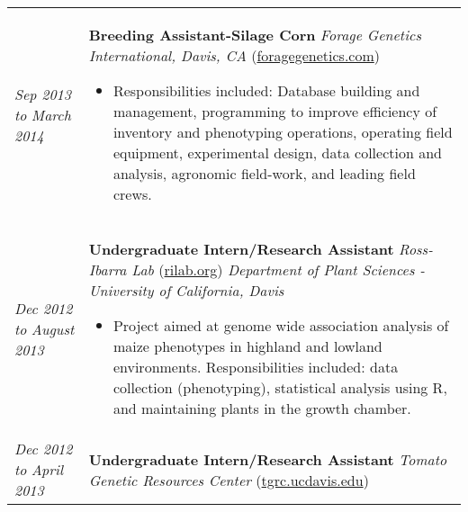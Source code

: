 ﻿\documentclass[a4paper]{article}
\begin{document}
\begin{tabular}{p{3cm} p{14cm}}
%
\\
%
\vspace{0pt} 
\textit{Sep 2013}\newline
\textit{to}\newline
\textit{March 2014}\newline
& 
\vspace{0pt}
\textbf{Breeding Assistant-Silage Corn}\newline
\textit{Forage Genetics International, Davis, CA} (\href{http://www.foragegenetics.com/}{foragegenetics.com})
\begin{itemize}[noitemsep,topsep=0pt]
  \item Responsibilities included: Database building and management, programming to improve efficiency of inventory and phenotyping operations, operating field equipment, experimental design, data collection and analysis, agronomic field-work, and leading field crews.
\end{itemize}
%
\\
%
\vspace{0pt} 
\textit{Dec 2012}\newline
\textit{to}\newline
\textit{August 2013}\newline
& 
\vspace{0pt}
\textbf{Undergraduate Intern/Research Assistant}\newline
\textit{Ross-Ibarra Lab} (\href{http://www.rilab.org/}{rilab.org})\newline
\textit{Department of Plant Sciences - University of California, Davis}
\begin{itemize}[noitemsep,topsep=0pt]
  \item Project aimed at genome wide association analysis of maize phenotypes in highland and lowland environments. Responsibilities included: data collection (phenotyping), statistical analysis using R, and maintaining plants in the growth chamber.
\end{itemize}
%
\\
%
\vspace{0pt} 
\textit{Dec 2012}\newline
\textit{to}\newline
\textit{April 2013}\newline
&
\vspace{0pt}
\textbf{Undergraduate Intern/Research Assistant}\newline
\textit{Tomato Genetic Resources Center} (\href{http://tgrc.ucdavis.edu/}{tgrc.ucdavis.edu})\newline

\end{tabular}
\end{document}
